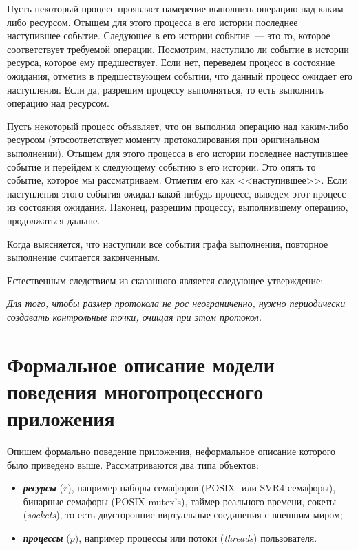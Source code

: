 \begin{multicols}{2}
{Пусть некоторый процесс проявляет намерение выполнить операцию над
каким-либо
 ресурсом. Отыщем для этого процесса в его истории последнее
наступившее событие. Следующее в его истории событие~--- это то, которое
соответствует требуемой операции. По\-смот\-рим, наступило ли событие в
истории ресурса, которое ему пред\-шес\-т\-ву\-ет. Если нет, переведем процесс в
состояние ожидания, отметив в предшествующем событии, что данный процесс
ожидает его наступления. Если да, разрешим процессу выполняться, то есть
выполнить операцию над ресурсом.

Пусть некоторый процесс объявляет, что он выполнил операцию над
каким-либо ресурсом (это\linebreak соответствует моменту протоколирования при
оригинальном выполнении). Отыщем для этого процесса в его истории
последнее наступившее событие и перейдем к следующему событию в его
истории. Это опять то событие, которое мы рас\-смат\-ри\-ва\-ем. Отметим его как
<<наступившее>>. Если наступления этого события ожидал какой-нибудь
процесс, выведем этот процесс из со\-сто\-яния ожидания. Наконец, разрешим
процессу, выполнившему операцию, продолжаться дальше.

Когда выясняется, что наступили все события графа выполнения, повторное
выполнение считается законченным.

Естественным следствием из сказанного является следующее утверждение:

\emph{Для того, чтобы размер протокола не рос неограниченно, нужно периодически 
создавать контрольные точки, очищая при этом протокол.}

}

\section{Формальное описание модели поведения
многопроцессного приложения}

Опишем формально поведение приложения, неформальное описание
которого было приведено выше. Рассматриваются два типа объектов:
\begin{itemize}
\item {\bfseries\textit{ресурсы}} ($r$), например наборы семафоров (POSIX- или
SVR4-семафоры), бинарные семафоры (POSIX-mutex's), таймер
реального времени, сокеты (\textit{sockets}), то есть двусторонние виртуальные
соединения с внешним миром;
\item {\bfseries\textit{процессы}} ($p$), например процессы или потоки
(\textit{threads}) пользователя.
\end{itemize}


\end{multicols}
